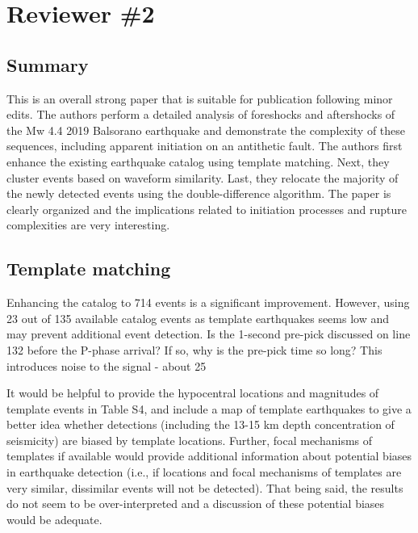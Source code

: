 \documentclass[10pt]{extarticle}
\begin{document}
\section*{Reviewer \#2}


\subsection*{Summary}

This is an overall strong paper that is suitable for publication following minor edits. The authors perform a detailed analysis of foreshocks and aftershocks of the Mw 4.4 2019 Balsorano earthquake and demonstrate the complexity of these sequences, including apparent initiation on an antithetic fault. The authors first enhance the existing earthquake catalog using template matching. Next, they cluster events based on waveform similarity. Last, they relocate the majority of the newly detected events using the double-difference algorithm. The paper is clearly organized and the implications related to initiation processes and rupture complexities are very interesting.  \\


\subsection*{Template matching}

\begin{ReviewerComment}{2}
\noindent 
Enhancing the catalog to 714 events is a significant improvement. However, using 23 out of 135 available catalog events as template earthquakes seems low and may prevent additional event detection. Is the 1-second pre-pick discussed on line 132 before the P-phase arrival? If so, why is the pre-pick time so long? This introduces noise to the signal - about 25%

\end{ReviewerComment}


\begin{Answer}
 \WorkInProgressRevTask
\end{Answer}
%
%



\begin{ReviewerComment}{1}
\noindent 
It would be helpful to provide the hypocentral locations and magnitudes of template events in Table S4, and include a map of template earthquakes to give a better idea whether detections (including the 13-15 km depth concentration of seismicity) are biased by template locations. Further, focal mechanisms of templates if available would provide additional information about potential biases in earthquake detection (i.e., if locations and focal mechanisms of templates are very similar, dissimilar events will not be detected). That being said, the results do not seem to be over-interpreted and a discussion of these potential biases would be adequate.

\end{ReviewerComment}
\end{document}

